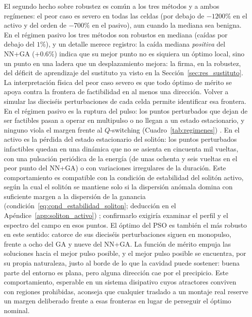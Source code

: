 El segundo hecho sobre robustez es común a los tres métodos y a ambos regímenes: el peor
caso es severo en todas las celdas (por debajo de $-1200\%$ en el activo y del orden de
$-700\%$ en el pasivo), aun cuando la mediana sea benigna. En el régimen pasivo los tres
métodos son robustos en mediana (caídas por debajo del $1\%$), y un detalle merece
registro: la caída mediana \emph{positiva} del NN+GA ($+0.6\%$) indica que su mejor punto
no es siquiera un óptimo local, sino un punto en una ladera que un desplazamiento mejora: la firma, en la robustez, del déficit de aprendizaje del sustituto ya visto en la
Sección~\ref{sec:res_sustituto}. La interpretación física del peor caso severo es que
todo óptimo de mérito se apoya contra la frontera de factibilidad en al menos una
dirección. %
Volver a simular las dieciséis perturbaciones de cada celda permite identificar esa
frontera. En el régimen pasivo es la ruptura del pulso: los puntos perturbados que dejan
de ser factibles pasan a operar en multipulso o no llegan a un estado estacionario, y
ninguno viola el margen frente al $Q$-switching (Cuadro~\ref{tab:regimenes})
\cite{Kaertner2020,GreluAkhmediev2012}.
En el activo es la pérdida del estado estacionario del solitón: los puntos perturbados
infactibles quedan en una dinámica que no se asienta en cincuenta mil vueltas, con una
pulsación periódica de la energía (de unas ochenta y seis vueltas en el peor punto del
NN+GA) o con variaciones irregulares de la duración. Este comportamiento es compatible
con la condición de estabilidad del solitón activo, según la cual el solitón se mantiene
solo si la dispersión anómala domina con suficiente margen a la dispersión de la
ganancia (condición~\eqref{eq:cond_estabilidad_soliton}; deducción en el
Apéndice~\ref{app:soliton_activo}) \cite{Kaertner2020}; confirmarlo exigiría examinar el perfil y el espectro del
campo en esos puntos. El óptimo del PSO es también el más robusto en este sentido:
catorce de sus dieciséis perturbaciones siguen en monopulso, frente a ocho del GA y
nueve del NN+GA. La función de mérito empuja las soluciones
hacia el mejor pulso posible, y el mejor pulso posible se encuentra, por su propia
naturaleza, justo al borde de lo que la cavidad puede sostener: buena parte del entorno
es plana, pero alguna dirección cae por el precipicio. Este comportamiento, esperable en
un sistema disipativo cuyos atractores conviven con regiones prohibidas, aconseja que
cualquier traslado a un montaje real reserve un margen deliberado frente a esas fronteras
en lugar de perseguir el óptimo nominal.

